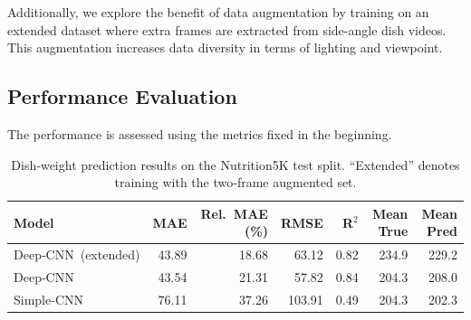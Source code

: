 \documentclass[a4paper]{article}
\begin{document}


        Additionally, we explore the benefit of data augmentation by training on an extended dataset where extra frames are extracted from side-angle dish videos. This augmentation increases data diversity in terms of lighting and viewpoint.

        
        
        \subsection{Performance Evaluation}

        The performance is assessed using the metrics fixed in the beginning. 
        \begin{table}[ht]
          \centering
          \caption{Dish‑weight prediction results on the Nutrition5K test split.
                   “Extended” denotes training with the two‑frame augmented set.}
          \label{tab:weight_results}
          \begin{tabular}{lrrrrrr}
            \toprule
            \textbf{Model} & \textbf{MAE} & \textbf{Rel.\ MAE (\%)} &
            \textbf{RMSE} & \textbf{R$^{2}$} &
            \textbf{Mean True} & \textbf{Mean Pred} \\
            \midrule
            Deep‑CNN (extended) & 43.89 & 18.68 & 63.12 & 0.82 & 234.9 & 229.2 \\
            Deep‑CNN            & 43.54 & 21.31 & 57.82 & 0.84 & 204.3 & 208.0 \\
            Simple‑CNN          & 76.11 & 37.26 & 103.91 & 0.49 & 204.3 & 202.3 \\
            \bottomrule
          \end{tabular}
        \end{table}
\end{document}
